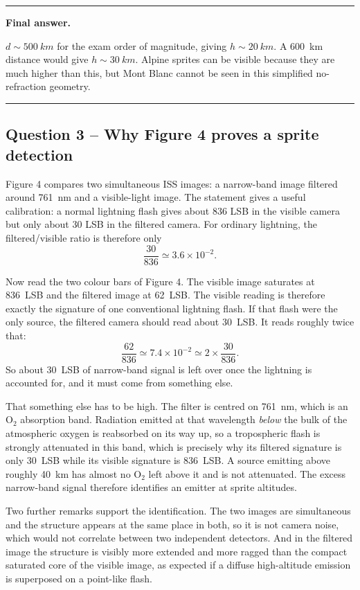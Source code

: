 \documentclass[11pt,a4paper]{article}
\newenvironment{finalanswer}{%
  \begin{center}\begin{minipage}{0.94\linewidth}\hrule\vspace{0.45em}\textbf{Final answer. }%
}{%
  \vspace{0.45em}\hrule\end{minipage}\end{center}%
}
\newcommand{\Otwo}{\ensuremath{\mathrm{O}_2}}
\begin{document}
\begin{finalanswer}
$d\sim\SI{500}{km}$ for the exam order of magnitude, giving $h\sim\SI{20}{km}$. A \SI{600}{km} distance would give $h\sim\SI{30}{km}$. Alpine sprites can be visible because they are much higher than this, but Mont Blanc cannot be seen in this simplified no-refraction geometry.
\end{finalanswer}

\subsection*{Question 3 -- Why Figure 4 proves a sprite detection}

Figure 4 compares two simultaneous ISS images: a narrow-band image filtered around \SI{761}{nm} and a visible-light image. The statement gives a useful calibration: a normal lightning flash gives about 836 LSB in the visible camera but only about 30 LSB in the filtered camera. For ordinary lightning, the filtered/visible ratio is therefore only
\[
 \frac{30}{836}\simeq3.6\times10^{-2}.
\]

Now read the two colour bars of Figure 4. The visible image saturates at
836~LSB and the filtered image at 62~LSB. The visible reading is therefore
exactly the signature of one conventional lightning flash. If that flash were the
only source, the filtered camera should read about 30~LSB. It reads roughly twice
that:
\[
 \frac{62}{836}\simeq7.4\times10^{-2}\simeq2\times\frac{30}{836}.
\]
So about 30~LSB of narrow-band signal is left over once the lightning is
accounted for, and it must come from something else.

That something else has to be high. The filter is centred on \SI{761}{nm},
which is an \Otwo{} absorption band. Radiation emitted at that wavelength
\emph{below} the bulk of the atmospheric oxygen is reabsorbed on its way up, so a
tropospheric flash is strongly attenuated in this band, which is precisely why
its filtered signature is only 30~LSB while its visible signature is 836~LSB. A
source emitting above roughly \SI{40}{km} has almost no \Otwo{} left above it and
is not attenuated. The excess narrow-band signal therefore identifies an emitter
at sprite altitudes.

Two further remarks support the identification. The two images are simultaneous
and the structure appears at the same place in both, so it is not camera noise,
which would not correlate between two independent detectors. And in the filtered
image the structure is visibly more extended and more ragged than the compact
saturated core of the visible image, as expected if a diffuse high-altitude
emission is superposed on a point-like flash.
\end{document}
